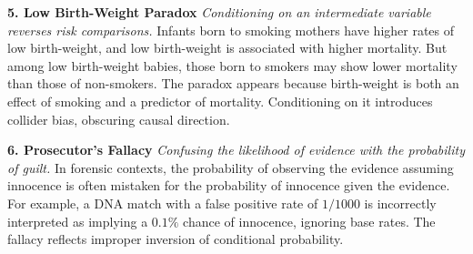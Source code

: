 \begin{tcolorbox}[
  colback=gray!2,
  colframe=gray!60,
  boxrule=0.4pt,
  width=\textwidth,
  arc=1pt,
  left=8pt,
  right=8pt,
  top=6pt,
  bottom=6pt,
  shadow={0mm}{-0.5mm}{0mm}{gray!30}
]
\vspace{1em}

\textbf{5. Low Birth-Weight Paradox}  
\emph{Conditioning on an intermediate variable reverses risk comparisons.}  
Infants born to smoking mothers have higher rates of low birth-weight, and low birth-weight is associated with higher mortality. But among low birth-weight babies, those born to smokers may show lower mortality than those of non-smokers. The paradox appears because birth-weight is both an effect of smoking and a predictor of mortality. Conditioning on it introduces collider bias, obscuring causal direction.

\vspace{1em}

\textbf{6. Prosecutor’s Fallacy}  
\emph{Confusing the likelihood of evidence with the probability of guilt.}  
In forensic contexts, the probability of observing the evidence assuming innocence is often mistaken for the probability of innocence given the evidence. For example, a DNA match with a false positive rate of $1/1000$ is incorrectly interpreted as implying a $0.1\%$ chance of innocence, ignoring base rates. The fallacy reflects improper inversion of conditional probability.

\end{tcolorbox}